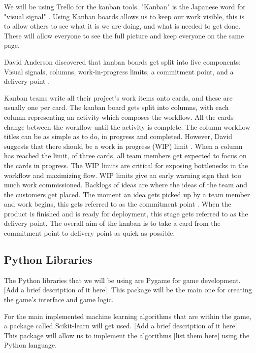 \documentclass[a4paper,10pt]{article}
\begin{document}
We will be using Trello for the kanban tools. "Kanban" is the Japanese word for "visual signal" \cite{kanbanmeaning}. Using Kanban boards allows us to keep our work visible, this is to allow others to see what it is we are doing, and what is needed to get done. These will allow everyone to see the full picture and keep everyone on the same page.

David Anderson discovered that kanban boards get split into five components: Visual signals, columns, work-in-progress limits, a commitment point, and a delivery point \cite{anderson2010kanban}.

Kanban teams write all their project's work items onto cards, and these are usually one per card. The kanban board gets split into columns, with each column representing an activity which composes the workflow. All the cards change between the workflow until the activity is complete. The column workflow titles can be as simple as to do, in progress and completed. However, David suggests that there should be a work in progress (WIP) limit \cite{anderson2010kanban}. When a column has reached the limit, of three cards, all team members get expected to focus on the cards in progress. The WIP limits are critical for exposing bottlenecks in the workflow and maximizing flow. WIP limits give an early warning sign that too much work commissioned. Backlogs of ideas are where the ideas of the team and the customers get placed. The moment an idea gets picked up by a team member and work begins, this gets referred to as the commitment point \cite{anderson2010kanban}. When the product is finished and is ready for deployment, this stage gets referred to as the delivery point. The overall aim of the kanban is to take a card from the commitment point to delivery point as quick as possible.  

\subsection{Python Libraries} %
The Python libraries that we will be using are Pygame for game development. [Add a brief description of it here]. This package will be the main one for creating the game's interface and game logic. 

For the main implemented machine learning algorithms that are within the game, a package called Scikit-learn will get used. [Add a brief description of it here]. This package will allow us to implement the algorithms [list them here] using the Python language.
\end{document}

